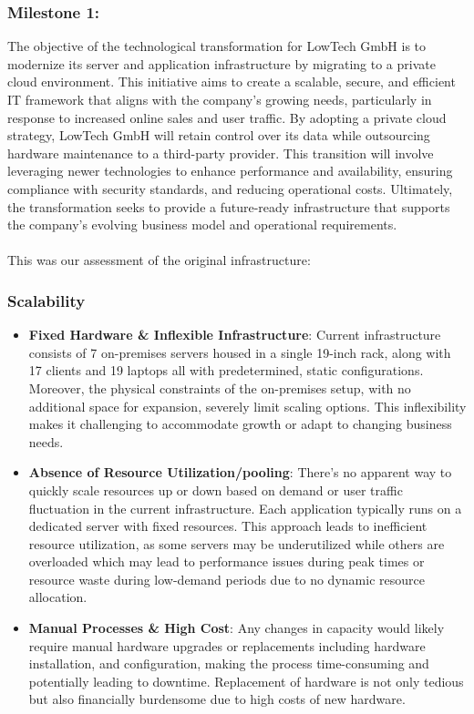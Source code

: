\documentclass{llncs}
\begin{document}
\subsubsection{Milestone 1:}

The objective of the technological transformation for LowTech GmbH is to modernize its server and application infrastructure by migrating to a private cloud environment.
This initiative aims to create a scalable, secure, and efficient IT framework that aligns with the company's growing needs, particularly in response to increased online sales and user traffic.
By adopting a private cloud strategy, LowTech GmbH will retain control over its data while outsourcing hardware maintenance to a third-party provider.
This transition will involve leveraging newer technologies to enhance performance and availability, ensuring compliance with security standards, and reducing operational costs.
Ultimately, the transformation seeks to provide a future-ready infrastructure that supports the company's evolving business model and operational requirements.
\paragraph{}
This was our assessment of the original infrastructure:
\subsubsection*{Scalability}
\begin{itemize}
    \item \textbf{Fixed Hardware \& Inflexible Infrastructure}:
          Current infrastructure consists of 7 on-premises servers housed in a single 19-inch rack,
          along with 17 clients and 19 laptops all with predetermined, static configurations.
          Moreover, the physical constraints of the on-premises setup, with no additional space for expansion, severely limit scaling options.
          This inflexibility makes it challenging to accommodate growth or adapt to changing business needs.

    \item \textbf{Absence of Resource Utilization/pooling}:
          There's no apparent way to quickly scale resources up or down based on demand or user traffic fluctuation in the current infrastructure.
          Each application typically runs on a dedicated server with fixed resources.
          This approach leads to inefficient resource utilization, as some servers may be underutilized while others are overloaded which may lead to performance issues during peak times or resource waste during low-demand periods due to no dynamic resource allocation.
    \item \textbf{Manual Processes \& High Cost}:
          Any changes in capacity would likely require manual hardware upgrades or replacements including hardware installation,
          and configuration, making the process time-consuming and potentially leading to downtime.
          Replacement of hardware is not only tedious but also financially burdensome due to high costs of new hardware.

\end{itemize}
\end{document}
